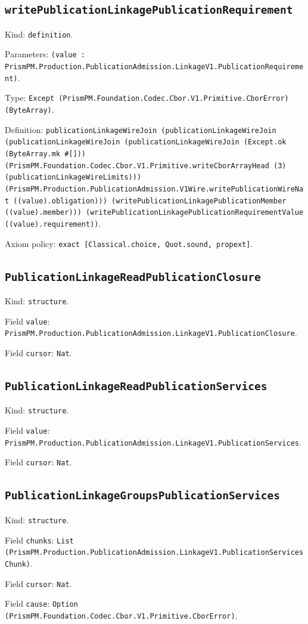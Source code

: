 \documentclass[11pt]{article}
\begin{document}
\subsection*{\texttt{writePublicationLinkagePublicationRequirement}}
\noindent Kind: \texttt{definition}.\par
\noindent Parameters: \texttt{(value : PrismPM.Production.PublicationAdmission.LinkageV1.PublicationRequirement)}.\par
\noindent Type: \texttt{Except (PrismPM.Foundation.Codec.Cbor.V1.Primitive.CborError) (ByteArray)}.\par
\noindent Definition: \texttt{publicationLinkageWireJoin (publicationLinkageWireJoin (publicationLinkageWireJoin (publicationLinkageWireJoin (Except.ok (ByteArray.mk \#[])) (PrismPM.Foundation.Codec.Cbor.V1.Primitive.writeCborArrayHead (3) (publicationLinkageWireLimits))) (PrismPM.Production.PublicationAdmission.V1Wire.writePublicationWireNat ((value).obligation))) (writePublicationLinkagePublicationMember ((value).member))) (writePublicationLinkagePublicationRequirementValue ((value).requirement))}.\par
\noindent Axiom policy: \texttt{exact [Classical.choice, Quot.sound, propext]}.\par
\subsection*{\texttt{PublicationLinkageReadPublicationClosure}}
\noindent Kind: \texttt{structure}.\par
\noindent Field \texttt{value}: \texttt{PrismPM.Production.PublicationAdmission.LinkageV1.PublicationClosure}.\par
\noindent Field \texttt{cursor}: \texttt{Nat}.\par
\subsection*{\texttt{PublicationLinkageReadPublicationServices}}
\noindent Kind: \texttt{structure}.\par
\noindent Field \texttt{value}: \texttt{PrismPM.Production.PublicationAdmission.LinkageV1.PublicationServices}.\par
\noindent Field \texttt{cursor}: \texttt{Nat}.\par
\subsection*{\texttt{PublicationLinkageGroupsPublicationServices}}
\noindent Kind: \texttt{structure}.\par
\noindent Field \texttt{chunks}: \texttt{List (PrismPM.Production.PublicationAdmission.LinkageV1.PublicationServicesChunk)}.\par
\noindent Field \texttt{cursor}: \texttt{Nat}.\par
\noindent Field \texttt{cause}: \texttt{Option (PrismPM.Foundation.Codec.Cbor.V1.Primitive.CborError)}.\par
\end{document}
